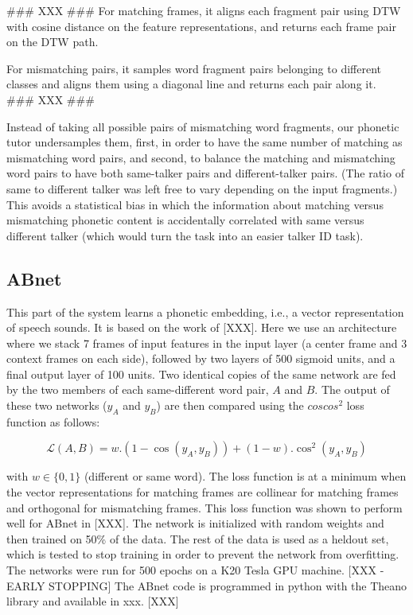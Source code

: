 \documentclass[a4paper]{article}
\begin{document}
### XXX ###
For matching frames, it aligns each fragment pair using DTW with cosine distance on the feature representations, and returns each frame pair on the DTW path.

For mismatching pairs, it samples word fragment pairs belonging to different classes and aligns them using a diagonal line and returns each pair along it.
### XXX ###

Instead of taking all possible pairs of mismatching word fragments, our phonetic tutor undersamples them, first, in order to have the same number of matching as mismatching word pairs, and second, to balance the matching and mismatching word pairs to have both same-talker pairs and different-talker pairs. (The ratio of same to different talker was left free to vary depending on the input fragments.) This avoids a statistical bias in which the information about matching versus mismatching phonetic content is accidentally correlated with same versus different talker (which would turn the task into an easier talker ID task).

\subsection{ABnet}

This part of the system learns a phonetic embedding, i.e., a vector representation of speech sounds. It is based on the work of \cite{synnaeve} [XXX]. Here we use an architecture where we stack 7 frames of input features in the input layer (a center frame and 3 context frames on each side), followed by two layers of 500 sigmoid units, and a final output layer of 100 units. Two identical copies of the same network are fed by the two members of each same-different word pair, $A$ and $B$. The output of these two networks ($y_A$ and $y_B$) are then compared using the $coscos^2$ loss function as follows:

\begin{equation}
\mathcal{L}(A,B) = w.(1-\cos(y_{A}, y_{B})) + (1-w).\cos^2(y_{A}, y_{B})
\end{equation}

with $w \in \{0,1\}$ (different or same word). The loss function is at a minimum when the vector representations for matching frames are collinear for matching frames and orthogonal for mismatching frames. This loss function was shown to perform well for ABnet in \cite{synnaeve} [XXX]. The network is initialized with random weights and then trained on 50\% of the data. The rest of the data is used as a heldout set, which is tested to stop training in order to prevent the network from overfitting. The networks were run for 500 epochs on a K20 Tesla GPU machine. [XXX - EARLY STOPPING] The ABnet code is programmed in python with the Theano library and available in xxx. [XXX]
\end{document}
